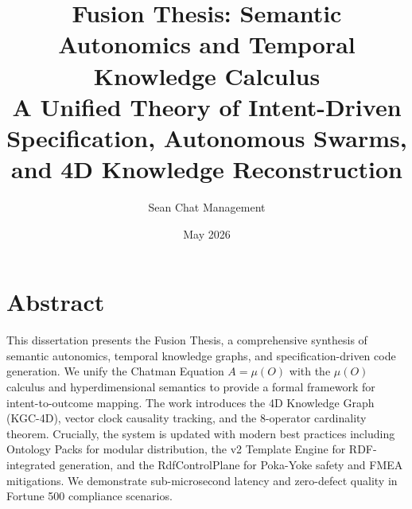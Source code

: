\documentclass[12pt,letterpaper,oneside]{report}
\title{\textbf{Fusion Thesis: Semantic Autonomics and Temporal Knowledge Calculus}\\
\Large A Unified Theory of Intent-Driven Specification, Autonomous Swarms, and 4D Knowledge Reconstruction}
\author{Sean Chat Management}
\date{May 2026}
\begin{document}
\maketitle

\chapter*{Abstract}
This dissertation presents the Fusion Thesis, a comprehensive synthesis of semantic autonomics, temporal knowledge graphs, and specification-driven code generation. We unify the Chatman Equation $A = \mu(O)$ with the $\mu(O)$ calculus and hyperdimensional semantics to provide a formal framework for intent-to-outcome mapping. The work introduces the 4D Knowledge Graph (KGC-4D), vector clock causality tracking, and the 8-operator cardinality theorem. Crucially, the system is updated with modern best practices including Ontology Packs for modular distribution, the v2 Template Engine for RDF-integrated generation, and the RdfControlPlane for Poka-Yoke safety and FMEA mitigations. We demonstrate sub-microsecond latency and zero-defect quality in Fortune 500 compliance scenarios.

\tableofcontents
\listoffigures
\listoftables










\appendix




\end{document}
